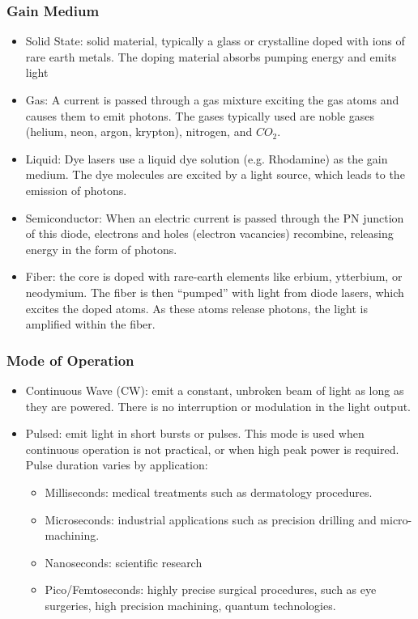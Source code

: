 \documentclass{beamer}
\begin{document}
\begin{frame}\frametitle{Gain Medium}
\begin{itemize}
\item Solid State: solid material, typically a glass or crystalline doped with ions of rare earth metals. The doping material absorbs pumping energy and emits light
\item Gas: A current is passed through a gas mixture exciting the gas atoms and causes them to emit photons. The gases typically used are noble gases (helium, neon, argon, krypton), nitrogen, and $CO_2$.
\item Liquid: Dye lasers use a liquid dye solution (e.g. Rhodamine) as the gain medium. The dye molecules are excited by a light source, which leads to the emission of photons.
\item Semiconductor: When an electric current is passed through the PN junction of this diode, electrons and holes (electron vacancies) recombine, releasing energy in the form of photons.
\item Fiber: the core is doped with rare-earth elements like erbium, ytterbium, or neodymium. The fiber is then “pumped” with light from diode lasers, which excites the doped atoms. As these atoms release photons, the light is amplified within the fiber.
\end{itemize}
\end{frame}

\begin{frame}\frametitle{Mode of Operation}
\begin{itemize}
\item Continuous Wave (CW): emit a constant, unbroken beam of light as long as they are powered. There is no interruption or modulation in the light output.
\item Pulsed: emit light in short bursts or pulses. This mode is used when continuous operation is not practical, or when high peak power is required. Pulse duration varies by application:
\begin{itemize}
\item Milliseconds: medical treatments such as dermatology procedures.
\item Microseconds: industrial applications such as precision drilling and micro-machining.
\item Nanoseconds: scientific research
\item Pico/Femtoseconds: highly precise surgical procedures, such as eye surgeries, high precision machining, quantum technologies.
\end{itemize}
\end{itemize}
\end{frame}
\end{document}
